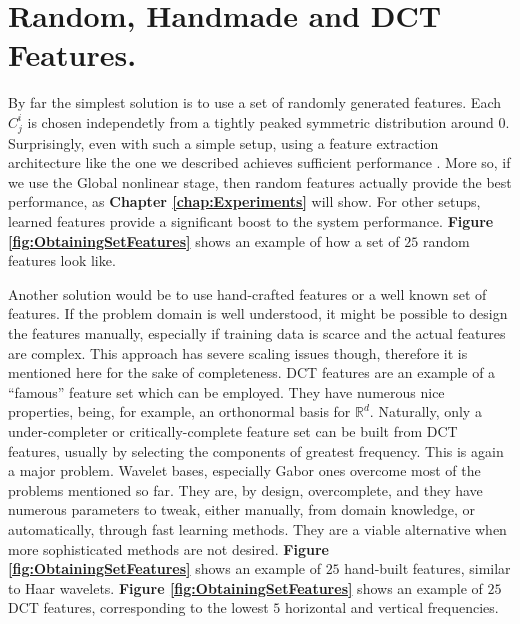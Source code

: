 \documentclass[12pt,a4paper,oneside,english]{UPBThesis}
\newcommand{\hcsignalspace}{\mathbb{R}^d}
\begin{document}
\section{Random, Handmade and DCT Features.}
\label{sec:RandomDCTPCAFeatures}

By far the simplest solution is to use a set of randomly generated features. Each $C_j^i$ is chosen independetly from a tightly peaked symmetric distribution around $0$. Surprisingly, even with such a simple setup, using a feature extraction architecture like the one we described achieves sufficient performance \cite{importance-encoding-sparse-coding-vq,beyond-simple-features}. More so, if we use the Global nonlinear stage, then random features actually provide the best performance, as \textbf{Chapter \ref{chap:Experiments}} will show. For other setups, learned features provide a significant boost to the system performance. \textbf{Figure \ref{fig:ObtainingSetFeatures}} shows an example of how a set of $25$ random features look like.

Another solution would be to use hand-crafted features or a well known set of features. If the problem domain is well understood, it might be possible to design the features manually, especially if training data is scarce and the actual features are complex. This approach has severe scaling issues though, therefore it is mentioned here for the sake of completeness. DCT features are an example of a ``famous'' feature set which can be employed. They have numerous nice properties, being, for example, an orthonormal basis for $\hcsignalspace$. Naturally, only a under-completer or critically-complete feature set can be built from DCT features, usually by selecting the components of greatest frequency. This is again a major problem. Wavelet bases, especially Gabor ones \cite{sparse-coding-strategy-V1,simple-method-sparse-coding} overcome most of the problems mentioned so far. They are, by design, overcomplete, and they have numerous parameters to tweak, either manually, from domain knowledge, or automatically, through fast learning methods. They are a viable alternative when more sophisticated methods are not desired. \textbf{Figure \ref{fig:ObtainingSetFeatures}} shows an example of $25$ hand-built features, similar to Haar wavelets. \textbf{Figure \ref{fig:ObtainingSetFeatures}} shows an example of $25$ DCT features, corresponding to the lowest $5$ horizontal and vertical frequencies.
\end{document}

